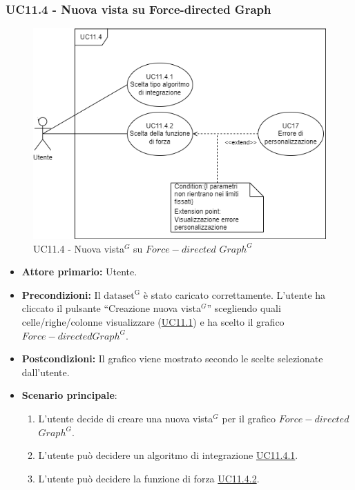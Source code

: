 \subsubsection{UC11.4 - Nuova vista su Force-directed Graph}
\label{sec:UC11.4}
\begin{figure}[h!]
	\centering
	\includegraphics[scale=0.60]{../../assets/creazionevista_force.png}
	\caption{UC11.4 - Nuova vista$^{G}$ su $Force-directed$ $Graph^{G}$}
\end{figure}
\begin{itemize}
    \item \textbf{Attore primario:} Utente.
    \item \textbf{Precondizioni:} Il ${\mathrm{dataset^{G}}}$ è stato caricato correttamente. L'utente ha cliccato il pulsante ``Creazione nuova vista$^{G}$'' scegliendo quali celle/righe/colonne visualizzare (\hyperref[sec:UC11.1]{UC11.1}) e ha scelto il grafico $Force-directed Graph^{G}$.
    \item \textbf{Postcondizioni:} Il grafico viene mostrato secondo le scelte selezionate dall'utente.
    \item \textbf{Scenario principale}:
    \begin{enumerate}
		\item L'utente decide di creare una nuova vista$^{G}$ per il grafico $Force-directed$ $Graph^{G}$.
		\item L'utente può decidere un algoritmo di integrazione \hyperref[sec:UC11.4.1]{UC11.4.1}.
		\item L'utente può decidere la funzione di forza \hyperref[sec:UC11.4.2]{UC11.4.2}.
	\end{enumerate}
\end{itemize}

